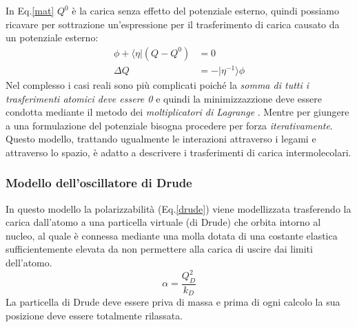 \documentclass[oneside]{amsbook}
\numberwithin{section}{chapter}
\numberwithin{equation}{section}
\numberwithin{figure}{section}
\begin{document}
In Eq.\ref{mat} $Q^0$ è la carica senza effetto del potenziale esterno, quindi possiamo ricavare per sottrazione un'espressione per il trasferimento di carica causato da un potenziale esterno:
\begin{equation}
\label{ct}
\begin{aligned}
\phi +\langle\eta \vert(Q-Q^0)&=0 \\
\Delta Q &= -\vert \eta ^{-1}\rangle \phi
\end{aligned}
\end{equation}
Nel complesso i casi reali sono più complicati poiché la \emph{somma di tutti i trasferimenti atomici deve essere 0} e quindi la minimizzazzione deve essere condotta mediante il metodo dei \emph{moltiplicatori di Lagrange} . Mentre per giungere a una formulazione del potenziale bisogna procedere per forza \emph{iterativamente}.
Questo modello, trattando ugualmente le interazioni attraverso i legami e attraverso lo spazio, è adatto a descrivere i trasferimenti di carica intermolecolari.
\subsubsection{Modello dell'oscillatore di Drude}
In questo modello la polarizzabilità (Eq.\ref{drude}) viene modellizzata trasferendo la carica dall'atomo a una particella virtuale (di Drude) che orbita intorno al nucleo, al quale è connessa mediante una molla dotata di una costante elastica sufficientemente elevata da non permettere alla carica di uscire dai limiti dell'atomo. 
\begin{equation}
\label{drude}
\alpha=\frac{Q_D^2}{k_D}
\end{equation}
La particella di Drude deve essere priva di massa  e prima di ogni calcolo la sua posizione deve essere totalmente rilassata.
\end{document}

